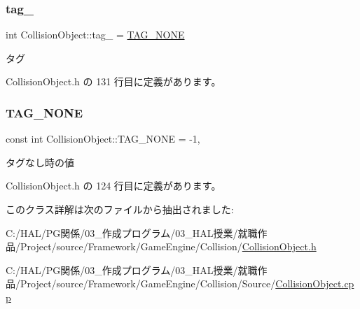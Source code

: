 \subsubsection{\texorpdfstring{tag\+\_\+}{tag\_}}
{\footnotesize\ttfamily int Collision\+Object\+::tag\+\_\+ = \mbox{\hyperlink{class_collision_object_a22badef1e6fc9c2b1f002bd99ede049f}{T\+A\+G\+\_\+\+N\+O\+NE}}\hspace{0.3cm}{\ttfamily [private]}}



タグ 



 Collision\+Object.\+h の 131 行目に定義があります。

\mbox{\label{class_collision_object_a22badef1e6fc9c2b1f002bd99ede049f}} 
\subsubsection{\texorpdfstring{T\+A\+G\+\_\+\+N\+O\+NE}{TAG\_NONE}}
{\footnotesize\ttfamily const int Collision\+Object\+::\+T\+A\+G\+\_\+\+N\+O\+NE = -\/1\hspace{0.3cm}{\ttfamily [static]}, {\ttfamily [private]}}



タグなし時の値 



 Collision\+Object.\+h の 124 行目に定義があります。



このクラス詳解は次のファイルから抽出されました\+:\begin{DoxyCompactItemize}
\item 
C\+:/\+H\+A\+L/\+P\+G関係/03\+\_\+作成プログラム/03\+\_\+\+H\+A\+L授業/就職作品/\+Project/source/\+Framework/\+Game\+Engine/\+Collision/\mbox{\hyperlink{_collision_object_8h}{Collision\+Object.\+h}}\item 
C\+:/\+H\+A\+L/\+P\+G関係/03\+\_\+作成プログラム/03\+\_\+\+H\+A\+L授業/就職作品/\+Project/source/\+Framework/\+Game\+Engine/\+Collision/\+Source/\mbox{\hyperlink{_collision_object_8cpp}{Collision\+Object.\+cpp}}\end{DoxyCompactItemize}
